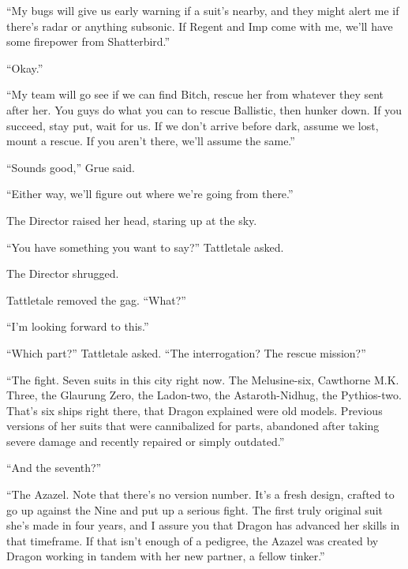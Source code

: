 ``My bugs will give us early warning if a suit's nearby, and they might alert me if there's radar or anything subsonic.  If Regent and Imp come with me, we'll have some firepower from Shatterbird.''



``Okay.''



``My team will go see if we can find Bitch, rescue her from whatever they sent after her.  You guys do what you can to rescue Ballistic, then hunker down.  If you succeed, stay put, wait for us.  If we don't arrive before dark, assume we lost, mount a rescue.  If you aren't there, we'll assume the same.''



``Sounds good,'' Grue said.



``Either way, we'll figure out where we're going from there.''



The Director raised her head, staring up at the sky.



``You have something you want to say?''  Tattletale asked.



The Director shrugged.



Tattletale removed the gag.  ``What?''



``I'm looking forward to this.''



``Which part?''  Tattletale asked.  ``The interrogation?  The rescue mission?''



``The fight.  Seven suits in this city right now.  The Melusine-six, Cawthorne M.K. Three, the Glaurung Zero, the Ladon-two, the Astaroth-Nidhug, the Pythios-two.  That's six ships right there, that Dragon explained were old models.  Previous versions of her suits that were cannibalized for parts, abandoned after taking severe damage and recently repaired or simply outdated.''



``And the seventh?''



``The Azazel.  Note that there's no version number.  It's a fresh design, crafted to go up against the Nine and put up a serious fight.  The first truly original suit she's made in four years, and I assure you that Dragon has advanced her skills in that timeframe.  If that isn't enough of a pedigree, the Azazel was created by Dragon working in tandem with her new partner, a fellow tinker.''



